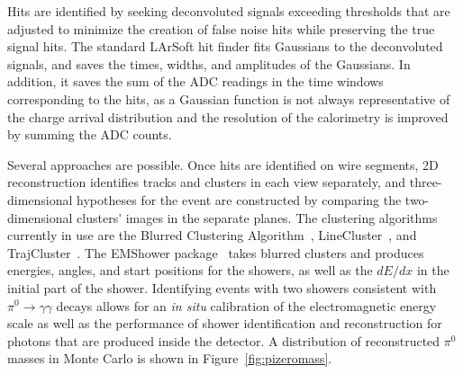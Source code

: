 Hits are identified by seeking deconvoluted signals exceeding
thresholds that are adjusted to minimize the creation of false noise
hits while preserving the true signal hits.  The standard LArSoft hit
finder fits Gaussians to the deconvoluted signals, and saves the
times, widths, and amplitudes of the Gaussians.  In addition, it saves the sum of
the ADC readings in the time windows corresponding to the hits, as a
Gaussian function is not always representative of the charge arrival
distribution and the resolution of the calorimetry is improved by
summing the ADC counts.

Several approaches 
are possible. Once hits are identified on wire
segments, 2D reconstruction identifies tracks and
clusters in each view separately, and three-dimensional hypotheses for
the event are constructed by comparing the two-dimensional clusters'
images in the separate planes.  The clustering algorithms currently in
use are the Blurred Clustering Algorithm~\cite{blurredclustering},
LineCluster~\cite{linecluster}, and TrajCluster~\cite{trajcluster}.  The
EMShower package~\cite{emshowerpackage} takes blurred clusters and
produces energies, angles, and start positions for the showers, as
well as the $dE/dx$ in the initial part of the shower.  Identifying
events with two showers consistent with $\pi^0\rightarrow\gamma\gamma$
decays allows for an {\it in situ} calibration of the electromagnetic
energy scale as well as the performance of shower identification and
reconstruction for photons that are produced inside the detector.  A
distribution of reconstructed $\pi^0$ masses in Monte Carlo is shown
in Figure~\ref{fig:pizeromass}.

